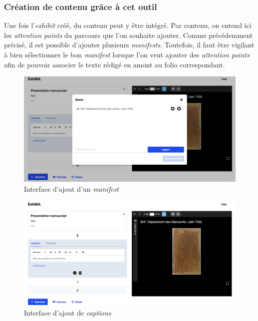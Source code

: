 	\subsubsection{Création de contenu grâce à cet outil} 
	Une fois l'\textit{exhibit} créé, du contenu peut y être intégré. Par contenu, on entend ici les \textit{attention points} du parcours que l'on souhaite ajouter. Comme précédemment précisé, il est possible d'ajouter plusieurs \textit{manifests}. Toutefois, il faut être vigilant à bien sélectionner le bon \textit{manifest} lorsque l'on veut ajouter des \textit{attention points} afin de pouvoir associer le texte rédigé en amont au folio correspondant. 
	
	\begin{figure}[h]
	\caption{Interface d'ajout d'un \textit{manifest}}
	\includegraphics[scale=0.2, angle=0]{images/partie3/exhibit/exhibit-manifest.png}
    \centering
    \end{figure}
    
    
    \begin{figure}[h]
	\caption{Interface d'ajout de \textit{captions}}
	\includegraphics[scale=0.3, angle=0]{images/partie3/exhibit/exhbit-captions.png}
    \centering
    \end{figure}
    
